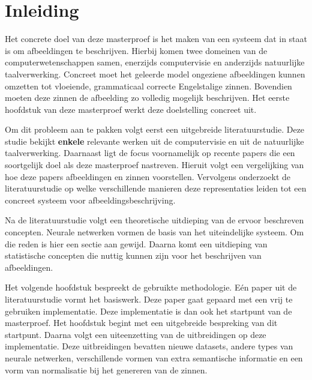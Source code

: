 \chapter{Inleiding}
\label{inleiding}
Het concrete doel van deze masterproef is het maken van een systeem dat in staat is om afbeeldingen te beschrijven. Hierbij komen twee domeinen van de computerwetenschappen samen, enerzijds computervisie en anderzijds natuurlijke taalverwerking. Concreet moet het geleerde model ongeziene afbeeldingen kunnen omzetten tot vloeiende, grammaticaal correcte Engelstalige zinnen. Bovendien moeten deze zinnen de afbeelding zo volledig mogelijk beschrijven. Het eerste hoofdstuk van deze masterproef werkt deze doelstelling concreet uit.


Om dit probleem aan te pakken volgt eerst een uitgebreide literatuurstudie. Deze studie bekijkt \textbf{enkele} relevante werken uit de computervisie en uit de natuurlijke taalverwerking. Daarnaast ligt de focus voornamelijk op recente papers die een soortgelijk doel als deze masterproef nastreven. Hieruit volgt een vergelijking van hoe deze papers afbeeldingen en zinnen voorstellen. Vervolgens onderzoekt de literatuurstudie op welke verschillende manieren deze representaties leiden tot een concreet systeem voor afbeeldingsbeschrijving.

Na de literatuurstudie volgt een theoretische uitdieping van de ervoor beschreven concepten. Neurale netwerken vormen de basis van het uiteindelijke systeem. Om die reden is hier een sectie aan gewijd. Daarna komt een uitdieping van statistische concepten die nuttig kunnen zijn voor het beschrijven van afbeeldingen.

Het volgende hoofdstuk bespreekt de gebruikte methodologie.
E\'en paper uit de literatuurstudie vormt het basiswerk. Deze paper gaat gepaard met een vrij te gebruiken implementatie. Deze implementatie is dan ook het startpunt van de masterproef. Het hoofdstuk begint met een uitgebreide bespreking van dit startpunt.
Daarna volgt een uiteenzetting van de uitbreidingen op deze implementatie. Deze uitbreidingen bevatten nieuwe datasets, andere types van neurale netwerken, verschillende vormen van extra semantische informatie en een vorm van normalisatie bij het genereren van de zinnen.

